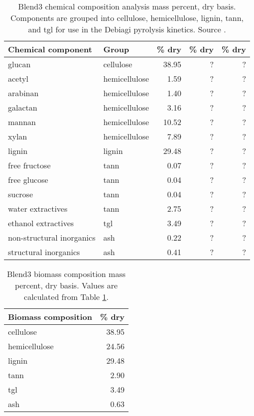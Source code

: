 \begin{table}[H]
    \centering
    \caption{Blend3 chemical composition analysis mass percent, dry basis. Components are grouped into cellulose, hemicellulose, lignin, tann, and tgl for use in the Debiagi pyrolysis kinetics. Source \cite{Starace-2020}.}
    \label{tab:chem-components}
    \begin{tabular}{llrrr}
        \toprule
        Chemical component & Group & \% dry & \% dry & \% dry \\
        \midrule
        glucan                    & cellulose      & 38.95 & ? & ? \\
        acetyl                    & hemicellulose  & 1.59  & ? & ? \\
        arabinan                  & hemicellulose  & 1.40  & ? & ? \\
        galactan                  & hemicellulose  & 3.16  & ? & ? \\
        mannan                    & hemicellulose  & 10.52 & ? & ? \\
        xylan                     & hemicellulose  & 7.89  & ? & ? \\
        lignin                    & lignin         & 29.48 & ? & ? \\
        free fructose             & tann           & 0.07  & ? & ? \\
        free glucose              & tann           & 0.04  & ? & ? \\
        sucrose                   & tann           & 0.04  & ? & ? \\
        water extractives         & tann           & 2.75  & ? & ? \\
        ethanol extractives       & tgl            & 3.49  & ? & ? \\
        non-structural inorganics & ash            & 0.22  & ? & ? \\
        structural inorganics     & ash            & 0.41  & ? & ? \\
        \bottomrule
    \end{tabular}
\end{table}

\begin{table}[H]
    \centering
    \caption{Blend3 biomass composition mass percent, dry basis. Values are calculated from Table \ref{tab:chem-components}.}
    \begin{tabular}{lr}
        \toprule
        Biomass composition & \% dry \\
        \midrule
        cellulose     & 38.95 \\
        hemicellulose & 24.56 \\
        lignin        & 29.48 \\
        tann          & 2.90  \\
        tgl           & 3.49  \\
        ash           & 0.63  \\
        \bottomrule
    \end{tabular}
\end{table}

